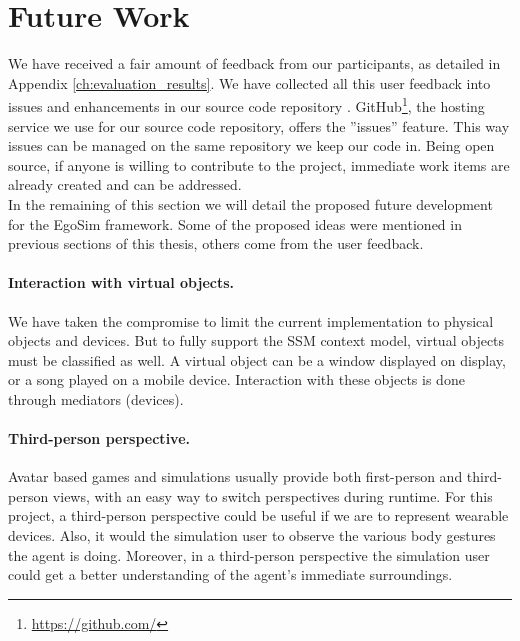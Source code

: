 \section{Future Work} %
\label{sec:eval_future_work}
We have received a fair amount of feedback from our participants, as detailed in Appendix \ref{ch:evaluation_results}. We have collected all this user feedback into issues and enhancements in our source code repository \cite{issues:online}. GitHub\footnote{\url{https://github.com/}}, the hosting service we use for our source code repository, offers the ''issues'' feature. This way issues can be managed on the same repository we keep our code in. Being open source, if anyone is willing to contribute to the project, immediate work items are already created and can be addressed.\\

In the remaining of this section we will detail the proposed future development for the EgoSim framework. Some of the proposed ideas were mentioned in previous sections of this thesis, others come from the user feedback.\\

\paragraph{Interaction with virtual objects.} We have taken the compromise to limit the current implementation to physical objects and devices. But to fully support the SSM context model, virtual objects must be classified as well. A virtual object can be a window displayed on display, or a song played on a mobile device. Interaction with these objects is done through mediators (devices).

\paragraph{Third-person perspective.} Avatar based games and simulations usually provide both first-person and third-person views, with an easy way to switch perspectives during runtime. For this project, a third-person perspective could be useful if we are to represent wearable devices. Also, it would the simulation user to observe the various body gestures the agent is doing. Moreover, in a third-person perspective the simulation user could get a better understanding of the agent's immediate surroundings.


